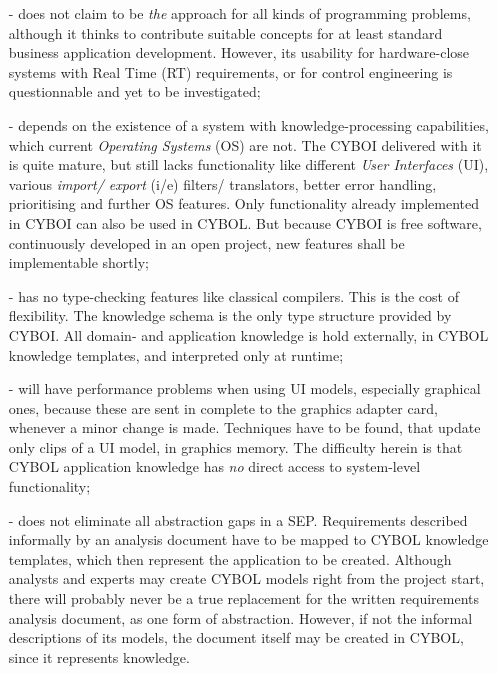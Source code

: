 \begin{itemize}
    \item[-] does not claim to be \emph{the} approach for all kinds of
        programming problems, although it thinks to contribute suitable
        concepts for at least standard business application development.
        However, its usability for hardware-close systems with Real Time (RT)
        requirements, or for control engineering is questionnable and yet to be
        investigated;
    \item[-] depends on the existence of a system with knowledge-processing
        capabilities, which current \emph{Operating Systems} (OS) are not. The
        CYBOI delivered with it is quite mature, but still lacks functionality
        like different \emph{User Interfaces} (UI), various \emph{import/ export}
        (i/e) filters/ translators, better error handling, prioritising and
        further OS features. Only functionality already implemented in CYBOI can
        also be used in CYBOL. But because CYBOI is free software, continuously
        developed in an open project, new features shall be implementable shortly;
    \item[-] has no type-checking features like classical compilers. This is
        the cost of flexibility. The knowledge schema is the only type
        structure provided by CYBOI. All domain- and application knowledge is
        hold externally, in CYBOL knowledge templates, and interpreted only at
        runtime;
    \item[-] will have performance problems when using UI models, especially
        graphical ones, because these are sent in complete to the graphics
        adapter card, whenever a minor change is made. Techniques have to be
        found, that update only clips of a UI model, in graphics memory. The
        difficulty herein is that CYBOL application knowledge has \emph{no}
        direct access to system-level functionality;
    \item[-] does not eliminate all abstraction gaps in a SEP. Requirements
        described informally by an analysis document have to be mapped to CYBOL
        knowledge templates, which then represent the application to be created.
        Although analysts and experts may create CYBOL models right from the
        project start, there will probably never be a true replacement for the
        written requirements analysis document, as one form of abstraction.
        However, if not the informal descriptions of its models, the document
        itself may be created in CYBOL, since it represents knowledge.
\end{itemize}

%
